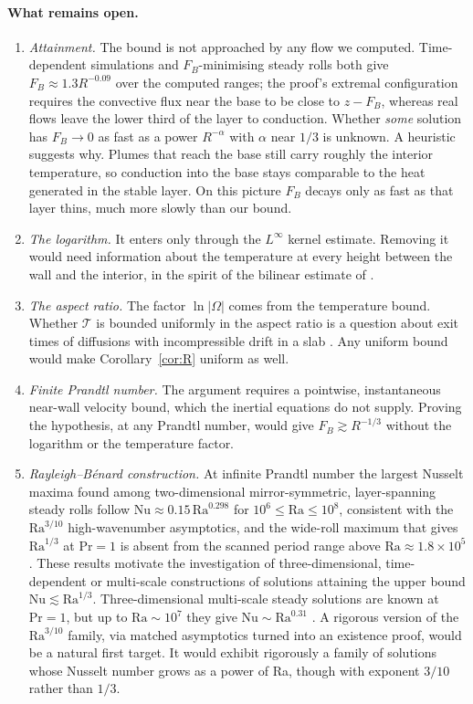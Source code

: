 \paragraph{What remains open.}
\begin{enumerate}
\item \emph{Attainment.} The bound is not approached by any flow we computed. Time-dependent simulations and
$F_B$-minimising steady rolls both give $F_B\approx1.3R^{-0.09}$ over the computed ranges; the proof's extremal configuration requires the convective flux near the
base to be close to $z-F_B$, whereas real flows leave the lower third of the layer to conduction. Whether
\emph{some} solution has $F_B\to0$ as fast as a power $R^{-\alpha}$ with $\alpha$ near $1/3$ is unknown. A
heuristic suggests why. Plumes that reach the base still carry roughly the interior temperature, so conduction into
the base stays comparable to the heat generated in the stable layer. On this picture $F_B$ decays only as fast as
that layer thins, much more slowly than our bound.
\item \emph{The logarithm.} It enters only through the $L^\infty$ kernel estimate. Removing it would need
information about the temperature at every height between the wall and the interior, in the spirit of the bilinear
estimate of \citet{ChanilloMalchiodi2025}.
\item \emph{The aspect ratio.} The factor $\ln|\Omega|$ comes from the temperature bound. Whether $\mathcal T$ is
bounded uniformly in the aspect ratio is a question about exit times of diffusions with incompressible drift in a
slab \citep{IyerEtAl2010}. Any uniform bound would make Corollary~\ref{cor:R} uniform as well.
\item \emph{Finite Prandtl number.} The argument requires a pointwise, instantaneous near-wall velocity bound, which
the inertial equations do not supply. Proving the \citet{ChenEtAl2024} hypothesis, at any Prandtl number, would give
$F_B\gtrsim R^{-1/3}$ without the logarithm or the temperature factor.
\item \emph{Rayleigh--B\'enard construction.} At infinite Prandtl number the largest Nusselt maxima found among
two-dimensional mirror-symmetric, layer-spanning steady rolls follow $\mathrm{Nu}\approx0.15\,\mathrm{Ra}^{0.298}$
for $10^6\le\mathrm{Ra}\le10^8$, consistent with the $\mathrm{Ra}^{3/10}$ high-wavenumber asymptotics, and the
wide-roll maximum that gives $\mathrm{Ra}^{1/3}$ at $\mathrm{Pr}=1$ is absent from the scanned period range above
$\mathrm{Ra}\approx1.8\times10^5$. These results motivate the investigation of three-dimensional,
time-dependent or multi-scale constructions of solutions attaining the upper bound
$\mathrm{Nu}\lesssim\mathrm{Ra}^{1/3}$. Three-dimensional multi-scale steady solutions are known at $\mathrm{Pr}=1$, but up to
$\mathrm{Ra}\sim10^7$ they give $\mathrm{Nu}\sim\mathrm{Ra}^{0.31}$ \citep{MotokiEtAl2021}. A rigorous version
of the $\mathrm{Ra}^{3/10}$ family, via matched asymptotics turned into an existence proof, would be a natural
first target. It would exhibit rigorously a family of solutions whose Nusselt number grows as a power of Ra,
though with exponent $3/10$ rather than $1/3$.
\end{enumerate}

